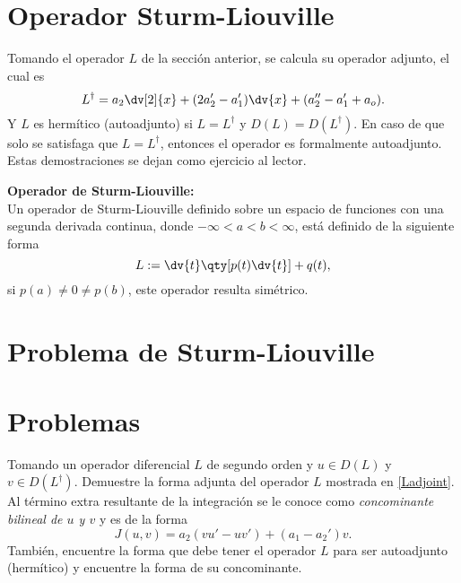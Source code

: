 	

\section*{Operador Sturm-Liouville}
Tomando el operador $L$ de la sección anterior, se calcula su operador adjunto, el cual es
\begin{equation}	
	L^\dagger = a_2 \dv[2]{x} + (2a_2 ' - a_1 ') \dv{x} + (a_2 '' - a_1 ' + a_o). \label{Ladjoint}
\end{equation}
Y $L$ es hermítico (autoadjunto) si $L = L^\dagger$ y $D(L) = D(L^\dagger)$. En caso de que solo se satisfaga que $L = L^\dagger$, entonces el operador es formalmente autoadjunto. Estas demostraciones se dejan como ejercicio al lector.


\begin{mdframed}[style=warning]
	{\Large \textbf{Operador de Sturm-Liouville:}} \\
	Un operador de Sturm-Liouville definido sobre un espacio de funciones con una segunda derivada continua, donde $-\infty < a < b < \infty$, está definido de la siguiente forma
		$$ L := \dv{t} \qty[p(t) \dv{t}] + q(t), $$
	si $p(a) \neq 0 \neq p(b)$, este operador resulta simétrico.
\end{mdframed}









\section*{Problema de Sturm-Liouville}
 




\pagebreak


\section*{Problemas}



\begin{ejercicio}
	Tomando un operador diferencial $L$ de segundo orden y $u \in D(L)$ y $v\in D(L^\dagger)$. Demuestre la forma adjunta del operador $L$ mostrada en \eqref{Ladjoint}. Al término extra resultante de la integración se le conoce como \textit{concominante bilineal de $u$ y $v$} y es de la forma
		$$ J(u,v) = a_2 (vu' - uv') + (a_1 - a_2')v. $$
	También, encuentre la forma que debe tener el operador $L$ para ser autoadjunto (hermítico) y encuentre la forma de su concominante.
\end{ejercicio}











